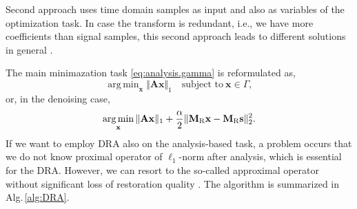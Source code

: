 \documentclass[conference]{IEEEtran}
\newcommand{\todo}[1]{\textcolor{red}{#1}}
\begin{document}
Second approach uses time domain samples as input and also as variables of the optimization task.
In case the transform is redundant, i.e., we have more coefficients than signal samples, this second approach leads to different solutions in general \cite{Mokry2020}. 

The main minimazation task \eqref{eq:analysis.gamma} is reformulated as,
\begin{equation}
	\label{eq:analysis.gamma}
	\mathop {\operatorname{arg \, min}}_\mathbf {x}\Vert \mathbf{A} \mathbf {x}\Vert _1 \quad \text{subject to}\ \mathbf {x}\in \Gamma,
\end{equation}
or, in the denoising case,
\begin{equation}
	\label{eq:analysis.dist}
	\mathop {\operatorname{arg \, min}}_\mathbf {x}\Vert \mathbf{A} \mathbf {x}\Vert _1 + \frac{\alpha}{2} \Vert \mathbf{M}_{\textup{R}} \mathbf {x} - \mathbf{M}_{\textup{R}} \mathbf{s} \Vert^2_2.
\end{equation} 
If we want to employ DRA also on the analysis-based task, a problem occurs
that we do not know proximal operator of $ \ell_1 $-norm after analysis, which is essential for the DRA.
However, we can resort to the so-called approximal operator without significant loss of restoration quality \cite{Mokry2021}.
The algorithm is summarized in Alg.\,\ref{alg:DRA}.
\end{document}
